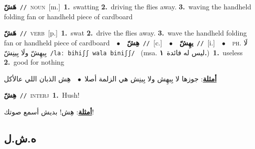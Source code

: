 \documentclass[10pt,a4paper,twoside]{article} %
\begin{document}
\begin{multicols}{2}
{\setlength\topsep{0pt}\textbf{\foreignlanguage{arabic}{هَشّ}}\ {\color{gray}\texttt{//}\color{black}}\ \textsc{noun}\ [m.]\ \textbf{1.}~swatting  \textbf{2.}~driving the flies away.  \textbf{3.}~waving the handheld folding fan or handheld piece of cardboard\ } \vspace{2mm}

{\setlength\topsep{0pt}\textbf{\foreignlanguage{arabic}{هَشّ}}\ {\color{gray}\texttt{//}\color{black}}\ \textsc{verb}\ [p.]\ \textbf{1.}~swat  \textbf{2.}~drive the flies away.  \textbf{3.}~wave the handheld folding fan or handheld piece of cardboard\ \ $\bullet$\ \ \setlength\topsep{0pt}\textbf{\foreignlanguage{arabic}{هِشّ}}\ {\color{gray}\texttt{//}\color{black}}\ [c.]\ \ $\bullet$\ \ \setlength\topsep{0pt}\textbf{\foreignlanguage{arabic}{يهِشّ}}\ {\color{gray}\texttt{//}\color{black}}\ [i.]\ \ $\bullet$\ \ \textsc{ph.} \color{gray} \foreignlanguage{arabic}{لَا بِيهِشّ ولَا بِينِشّ}\color{black}\ {\color{gray}\texttt{/{\sffamily laː bihiʃʃ wala biniʃʃ}/}\color{black}}\ \color{gray} (msa. \foreignlanguage{arabic}{ليس له فائدة}~\foreignlanguage{arabic}{\textbf{١.}})\color{black}\ \textbf{1.}~useless  \textbf{2.}~good for nothing\  \begin{flushright}\color{gray}\foreignlanguage{arabic}{\textbf{\underline{\foreignlanguage{arabic}{أمثلة}}}: جوزها لا بِيهِش ولا بِينِش هي الزلمة أصلا\ $\bullet$\ \  هِش الذبان اللي عالأكل}\end{flushright}\color{black}} \vspace{2mm}

{\setlength\topsep{0pt}\textbf{\foreignlanguage{arabic}{هِشّ}}\ {\color{gray}\texttt{//}\color{black}}\ \textsc{interj}\ \textbf{1.}~Hush!\  \begin{flushright}\color{gray}\foreignlanguage{arabic}{\textbf{\underline{\foreignlanguage{arabic}{أمثلة}}}: هِش! بديش أسمع صوتك!}\end{flushright}\color{black}} \vspace{2mm}

\vspace{-3mm}
\subsection*{\color{blue}\foreignlanguage{arabic}{ه.ش.ل}\color{blue}{}} 


\end{multicols}
\end{document}
